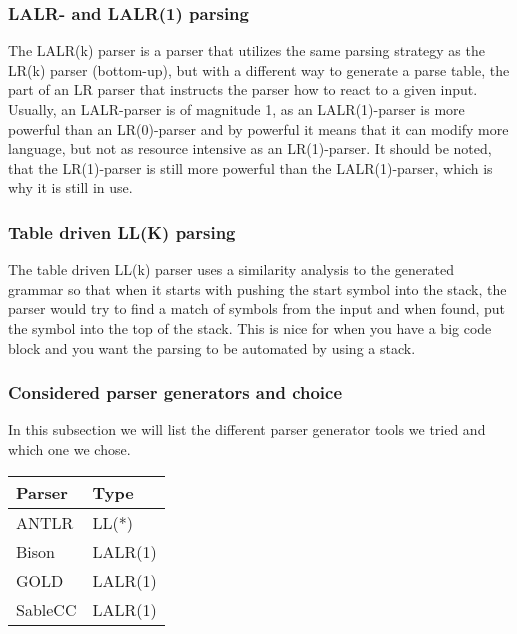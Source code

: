 \subsubsection*{LALR- and LALR(1) parsing}
The LALR(k) parser is a parser that utilizes the same parsing strategy as the LR(k) parser (bottom-up), but with a different way to generate a parse table, the part of an LR parser that instructs the parser how to react to a given input. Usually, an LALR-parser is of magnitude 1, as an LALR(1)-parser is more powerful than an LR(0)-parser and by powerful it means that it can modify more language\cite{crafting-a-compiler}, but not as resource intensive as an LR(1)-parser. It should be noted, that the LR(1)-parser is still more powerful than the LALR(1)-parser, which is why it is still in use\cite{crafting-a-compiler}.

\subsubsection*{Table driven LL(K) parsing}
The table driven LL(k) parser uses a similarity analysis to the generated grammar so that when it starts with pushing the start symbol into the stack, the parser would try to find a match of symbols from the input and when found, put the symbol into the top of the stack\cite{crafting-a-compiler}. This is nice for when you have a big code block and you want the parsing to be automated by using a stack.

\subsubsection{Considered parser generators and choice}
In this subsection we will list the different parser generator tools we tried and which one we chose. \\

\begin{table}[ht]
\centering
\begin{tabular}{@{}ll@{}}
\toprule
\textbf{Parser} & \textbf{Type} \\ \midrule
ANTLR           & LL(*)         \\
Bison           & LALR(1)       \\
GOLD            & LALR(1)       \\
SableCC         & LALR(1)       \\ \bottomrule
\end{tabular}
\label{parser_table}
\end{table}


